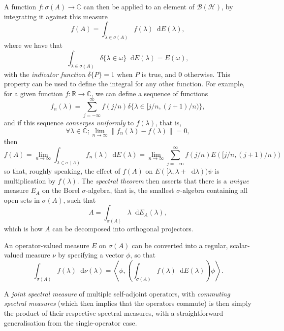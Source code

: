 \documentclass[10pt, a4paper]{article}
\newcommand{\norm}[1]{\left\lVert#1\right\rVert}
\newcommand{\dif}{\mathop{}\!\mathrm{d}} %
\newcommand{\?}{\mathrel{?}} %
\newcommand{\R}{\mathbb{R}} %
\newcommand{\C}{\mathbb{C}} %
\newcommand{\angleb}[1]{\left\langle #1 \right\rangle} %
\newcommand{\Hs}{\mathcal{H}} %
\numberwithin{equation}{section} %
\theoremstyle{definition}
\theoremstyle{plain}
\theoremstyle{plain}
\begin{document}
    A function \(f : \sigma(A) \to \C\) can then be applied to an element of \(\mathcal{B}(\Hs)\), by integrating it against this measure
    \[ f(A) = \int_{\lambda \in \sigma(A)} f(\lambda) \dif{E(\lambda)}, \]
    where we have that
    \[ \int_{\lambda \in \sigma(A)} \delta\{\lambda \in \omega\} \dif{E(\lambda)} = E(\omega), \]
    with the \emph{indicator function} \(\delta\{P\} = 1\) when \(P\) is true, and 0 otherwise. This property can be used to define the integral for any other function. For example, for a given function \(f : \R \to \C\), we can define a sequence of functions
    \[ f_n(\lambda) = \sum_{j = -\infty}^{\infty} f(j/n) \delta\{\lambda \in [j/n, (j+1)/n)\}, \]
    and if this sequence \emph{converges uniformly} to \(f(\lambda)\), that is,
    \[ \forall \lambda \in \C; \lim_{n \to \infty} \norm{f_n(\lambda) - f(\lambda)} = 0, \]
    then
  \[ f(A) = \lim_{n\to\infty} \int_{\lambda \in \sigma(A)} f_n(\lambda) \dif{E(\lambda)} = \lim_{n\to\infty} \sum_{j = -\infty}^{\infty} f(j/n) E([j/n, (j+1)/n)) \]
  so that, roughly speaking, the effect of \(f(A)\) on \(E([\lambda, \lambda+\dif{\lambda}))\psi\) is multiplication by \(f(\lambda)\). The \emph{spectral theorem} then asserts that there is a \emph{unique} measure \(E_A\) on the Borel \(\sigma\)-algebra, that is, the smallest \(\sigma\)-algebra containing all open sets in \(\sigma(A)\), such that
  \[ A = \int_{\sigma(A)} \lambda \dif{E_A(\lambda)}, \]
  which is how \(A\) can be decomposed into orthogonal projectors.

  An operator-valued measure \(E\) on \(\sigma(A)\) can be converted into a regular, scalar-valued measure \(\nu\) by specifying a vector \(\phi\), so that
  \[ \int_{\sigma(A)} f(\lambda) \dif{\nu(\lambda)} = \angleb{\phi, \left(\int_{\sigma(A)} f(\lambda) \dif{E(\lambda)}\right) \phi}. \]

  A \emph{joint spectral measure} of multiple self-adjoint operators, with \emph{commuting spectral measures} (which then implies that the operators commute) is then simply the product of their respective spectral measures, with a straightforward generalisation from the single-operator case.


 
\end{document}
